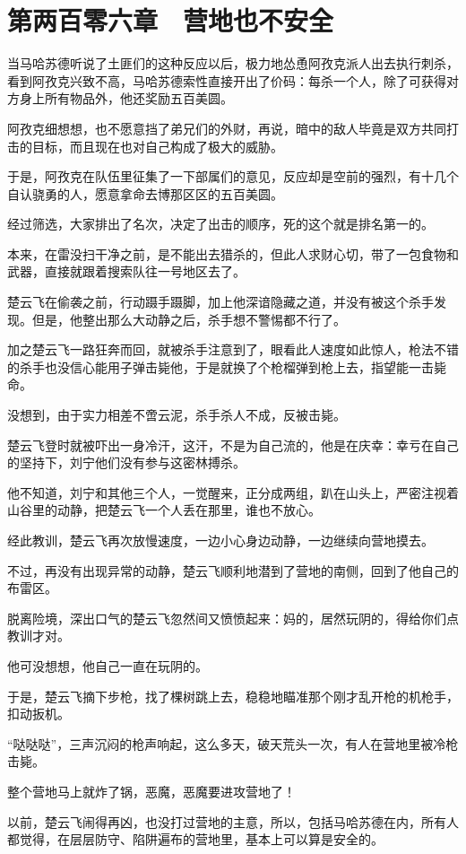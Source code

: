 \section{第两百零六章　营地也不安全}

当马哈苏德听说了土匪们的这种反应以后，极力地怂恿阿孜克派人出去执行刺杀，看到阿孜克兴致不高，马哈苏德索性直接开出了价码：每杀一个人，除了可获得对方身上所有物品外，他还奖励五百美圆。

阿孜克细想想，也不愿意挡了弟兄们的外财，再说，暗中的敌人毕竟是双方共同打击的目标，而且现在也对自己构成了极大的威胁。

于是，阿孜克在队伍里征集了一下部属们的意见，反应却是空前的强烈，有十几个自认骁勇的人，愿意拿命去博那区区的五百美圆。

经过筛选，大家排出了名次，决定了出击的顺序，死的这个就是排名第一的。

本来，在雷没扫干净之前，是不能出去猎杀的，但此人求财心切，带了一包食物和武器，直接就跟着搜索队往一号地区去了。

楚云飞在偷袭之前，行动蹑手蹑脚，加上他深谙隐藏之道，并没有被这个杀手发现。但是，他整出那么大动静之后，杀手想不警惕都不行了。

加之楚云飞一路狂奔而回，就被杀手注意到了，眼看此人速度如此惊人，枪法不错的杀手也没信心能用子弹击毙他，于是就换了个枪榴弹到枪上去，指望能一击毙命。

没想到，由于实力相差不啻云泥，杀手杀人不成，反被击毙。

楚云飞登时就被吓出一身冷汗，这汗，不是为自己流的，他是在庆幸：幸亏在自己的坚持下，刘宁他们没有参与这密林搏杀。

他不知道，刘宁和其他三个人，一觉醒来，正分成两组，趴在山头上，严密注视着山谷里的动静，把楚云飞一个人丢在那里，谁也不放心。

经此教训，楚云飞再次放慢速度，一边小心身边动静，一边继续向营地摸去。

不过，再没有出现异常的动静，楚云飞顺利地潜到了营地的南侧，回到了他自己的布雷区。

脱离险境，深出口气的楚云飞忽然间又愤愤起来：妈的，居然玩阴的，得给你们点教训才对。

他可没想想，他自己一直在玩阴的。

于是，楚云飞摘下步枪，找了棵树跳上去，稳稳地瞄准那个刚才乱开枪的机枪手，扣动扳机。

“哒哒哒”，三声沉闷的枪声响起，这么多天，破天荒头一次，有人在营地里被冷枪击毙。

整个营地马上就炸了锅，恶魔，恶魔要进攻营地了！

以前，楚云飞闹得再凶，也没打过营地的主意，所以，包括马哈苏德在内，所有人都觉得，在层层防守、陷阱遍布的营地里，基本上可以算是安全的。

